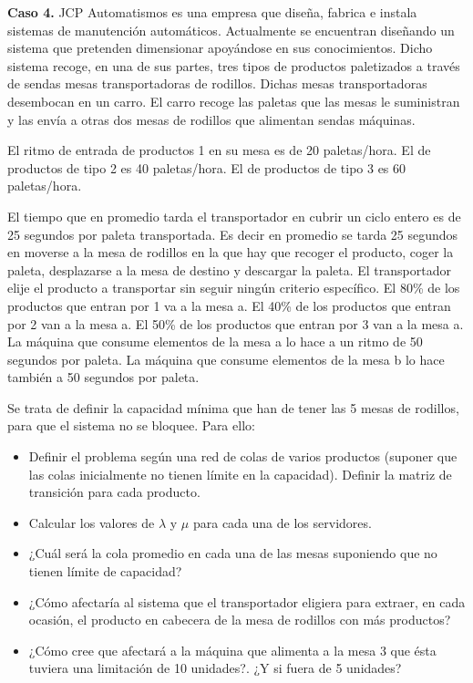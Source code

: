 \documentclass[
]{book}
\providecommand{\tightlist}{%
  \setlength{\itemsep}{0pt}\setlength{\parskip}{0pt}}
\theoremstyle{definition}
\theoremstyle{definition}
\theoremstyle{definition}
\theoremstyle{definition}
\theoremstyle{remark}
\begin{document}
\textbf{Caso 4.} JCP Automatismos es una empresa que diseña, fabrica e instala sistemas de manutención automáticos. Actualmente se encuentran diseñando un sistema que pretenden dimensionar apoyándose en sus conocimientos. Dicho sistema recoge, en una de sus partes, tres tipos de productos paletizados a través de sendas mesas transportadoras de rodillos. Dichas mesas transportadoras desembocan en un carro. El carro recoge las paletas que las mesas le suministran y las envía a otras dos mesas de rodillos que alimentan sendas máquinas.

El ritmo de entrada de productos 1 en su mesa es de 20 paletas/hora. El de productos de tipo 2 es 40 paletas/hora. El de productos de tipo 3 es 60 paletas/hora.

El tiempo que en promedio tarda el transportador en cubrir un ciclo entero es de 25 segundos por paleta transportada. Es decir en promedio se tarda 25 segundos en moverse a la mesa de rodillos en la que hay que recoger el producto, coger la paleta, desplazarse a la mesa de destino y descargar la paleta. El transportador elije el producto a transportar sin seguir ningún criterio específico. El 80\% de los productos que entran por 1 va a la mesa a. El 40\% de los productos que entran por 2 van a la mesa a. El 50\% de los productos que entran por 3 van a la mesa a. La máquina que consume elementos de la mesa a lo hace a un ritmo de 50 segundos por paleta. La máquina que consume elementos de la mesa b lo hace también a 50 segundos por paleta.

Se trata de definir la capacidad mínima que han de tener las 5 mesas de rodillos, para que el sistema no se bloquee. Para ello:

\begin{itemize}
\tightlist
\item
  Definir el problema según una red de colas de varios productos (suponer que las colas inicialmente no tienen límite en la capacidad). Definir la matriz de transición para cada producto.
\item
  Calcular los valores de \(\lambda\) y \(\mu\) para cada una de los servidores.
\item
  ¿Cuál será la cola promedio en cada una de las mesas suponiendo que no tienen límite de capacidad?
\item
  ¿Cómo afectaría al sistema que el transportador eligiera para extraer, en cada ocasión, el producto en cabecera de la mesa de rodillos con más productos?
\item
  ¿Cómo cree que afectará a la máquina que alimenta a la mesa 3 que ésta tuviera una limitación de 10 unidades?. ¿Y si fuera de 5 unidades?
\end{itemize}
\end{document}
